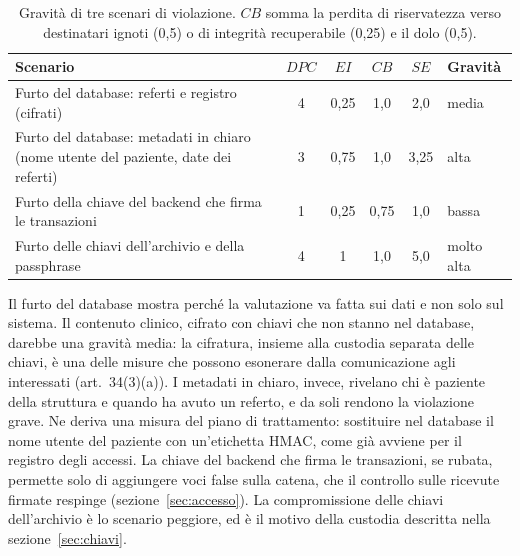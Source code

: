 \begin{table}[H]
\centering\footnotesize
\renewcommand{\arraystretch}{1.2}
\begin{tabular}{@{}p{} ccc c l@{}}
\toprule
Scenario & $DPC$ & $EI$ & $CB$ & $SE$ & Gravità\\
\midrule
Furto del database: referti e registro (cifrati) & 4 & 0,25 & 1,0 & 2,0 & media\\
Furto del database: metadati in chiaro (nome utente del paziente, date dei referti) & 3 & 0,75 & 1,0 & 3,25 & alta\\
Furto della chiave del backend che firma le transazioni & 1 & 0,25 & 0,75 & 1,0 & bassa\\
Furto delle chiavi dell'archivio e della passphrase & 4 & 1 & 1,0 & 5,0 & molto alta\\
\bottomrule
\end{tabular}
\caption{Gravità di tre scenari di violazione. $CB$ somma la perdita di riservatezza verso destinatari ignoti (0,5) o di integrità recuperabile (0,25) e il dolo (0,5).}\label{tab:enisa}
\end{table}

Il furto del database mostra perché la valutazione va fatta sui dati e non solo sul sistema. Il contenuto clinico, cifrato con chiavi che non stanno nel database, darebbe una gravità media: la cifratura, insieme alla custodia separata delle chiavi, è una delle misure che possono esonerare dalla comunicazione agli interessati (art.~34(3)(a)). I metadati in chiaro, invece, rivelano chi è paziente della struttura e quando ha avuto un referto, e da soli rendono la violazione grave. Ne deriva una misura del piano di trattamento: sostituire nel database il nome utente del paziente con un'etichetta HMAC, come già avviene per il registro degli accessi. La chiave del backend che firma le transazioni, se rubata, permette solo di aggiungere voci false sulla catena, che il controllo sulle ricevute firmate respinge (sezione~\ref{sec:accesso}). La compromissione delle chiavi dell'archivio è lo scenario peggiore, ed è il motivo della custodia descritta nella sezione~\ref{sec:chiavi}.

